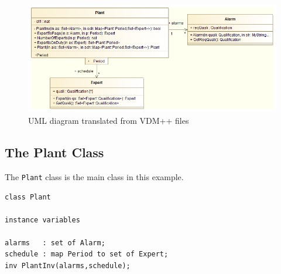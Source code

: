 \begin{figure}[!h]
\begin{center}
  \includegraphics[width=5in]{figures/FullUMLClassDiagram}
  \caption[labelInTOC]{UML diagram translated from VDM++ files}
  \label{fig:finalumlforalarm}
\end{center}
\end{figure}

%
\subsection{The Plant Class}
The \texttt{Plant} class is the main class in this example.

\begin{lstlisting}
class Plant

instance variables

alarms   : set of Alarm;
schedule : map Period to set of Expert;
inv PlantInv(alarms,schedule);
\end{lstlisting}

